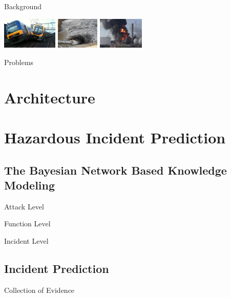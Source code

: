 \documentclass[10pt, compress]{beamer}
\begin{document}
\begin{frame}{Background}
\begin{center}
\begin{minipage}[m]{0.9\textwidth}
        \includegraphics[height=1.5cm]{Figures/Introduction/Fig7.png} \hfill
        \includegraphics[height=1.5cm]{Figures/Introduction/Fig8.png} \hfill
        \includegraphics[height=1.5cm]{Figures/Introduction/Fig9.png}
      \end{minipage}
    \end{center}
\end{frame}

\begin{frame}{Problems}
\end{frame}

\section{Architecture}

\section{Hazardous Incident Prediction}
\subsection{The Bayesian Network Based Knowledge Modeling}
\begin{frame}{Attack Level}
\end{frame}

\begin{frame}{Function Level}
\end{frame}

\begin{frame}{Incident Level}
\end{frame}

\subsection{Incident Prediction}
\begin{frame}{Collection of Evidence}
\end{frame}
\end{document}

